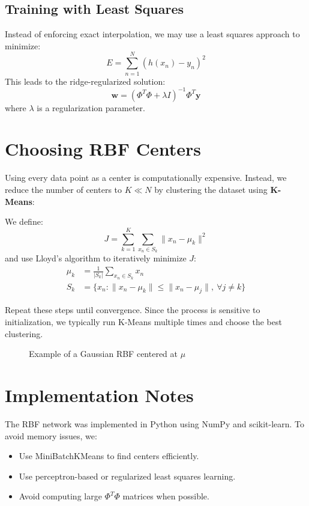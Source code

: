 \documentclass[twocolumn]{article} %
\begin{document}
\subsection{Training with Least Squares}
Instead of enforcing exact interpolation, we may use a least squares approach to minimize:
\[
E = \sum_{n=1}^N (h(x_n) - y_n)^2
\]
This leads to the ridge-regularized solution:
\[
\mathbf{w} = (\Phi^T\Phi + \lambda I)^{-1}\Phi^T \mathbf{y}
\]
where $\lambda$ is a regularization parameter.

\section{Choosing RBF Centers}
Using every data point as a center is computationally expensive. Instead, we reduce the number of centers to $K \ll N$ by clustering the dataset using \textbf{K-Means}:

We define:
\[
J = \sum_{k=1}^K \sum_{x_n \in S_k} \| x_n - \mu_k \|^2
\]
and use Lloyd's algorithm to iteratively minimize $J$:
\begin{align*}
\mu_k &= \frac{1}{|S_k|}\sum_{x_n \in S_k} x_n \\
S_k &= \{ x_n : \|x_n - \mu_k\| \leq \|x_n - \mu_j\|,\ \forall j \neq k \}
\end{align*}

Repeat these steps until convergence. Since the process is sensitive to initialization, we typically run K-Means multiple times and choose the best clustering.

\begin{figure}[h!]
    \centering
    
    \caption{Example of a Gaussian RBF centered at $\mu$}
    \label{fig:gaussian_rbf}
\end{figure} 

\section{Implementation Notes}
The RBF network was implemented in Python using NumPy and scikit-learn. To avoid memory issues, we:
\begin{itemize}
    \item Use MiniBatchKMeans to find centers efficiently.
    \item Use perceptron-based or regularized least squares learning.
    \item Avoid computing large $\Phi^T\Phi$ matrices when possible.
\end{itemize}
\end{document}
